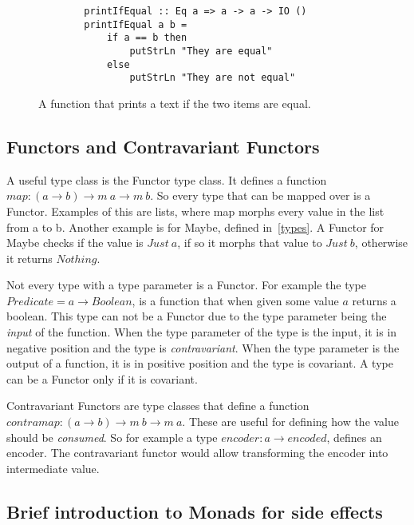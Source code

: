 \begin{figure}[H]
    \begin{lstlisting}
        printIfEqual :: Eq a => a -> a -> IO ()
        printIfEqual a b =
            if a == b then
                putStrLn "They are equal"
            else
                putStrLn "They are not equal"
    \end{lstlisting}
    \caption{A function that prints a text if the two items are equal.}
    \label{printifequal}
\end{figure}



\subsection{Functors and Contravariant Functors}

A useful type class is the Functor type class. It defines a function 
$map : (a\rightarrow b) \rightarrow m\ a \rightarrow m\ b$. So every type that
can be mapped over is a Functor. Examples of this are lists, where map morphs
every value in the list from a to b. Another example is for Maybe, defined
in~\ref{types}. A Functor for Maybe checks if the value is $Just\ a$, if so it
morphs that value to $Just\ b$, otherwise it returns $Nothing$. 

Not every type with a type parameter is a Functor. For example the type
$Predicate = a \rightarrow Boolean$, is a function that when given some value
$a$ returns a boolean. This type can not be a Functor due to the type parameter
being the \textit{input} of the function. When the type parameter of the type is
the input, it is in negative position and the type is \textit{contravariant}.
When the type parameter is the output of a function, it is in positive position
and the type is covariant. A type can be a Functor only if it is covariant.

Contravariant Functors are type classes that define a function $contramap :
(a\rightarrow b) \rightarrow m\ b \rightarrow m\ a$. These are useful for
defining how the value should be \textit{consumed}. So for example a type
$encoder : a\rightarrow encoded$, defines an encoder. The contravariant functor
would allow transforming the encoder into intermediate value.

\subsection{Brief introduction to Monads for side effects}\label{monads}

